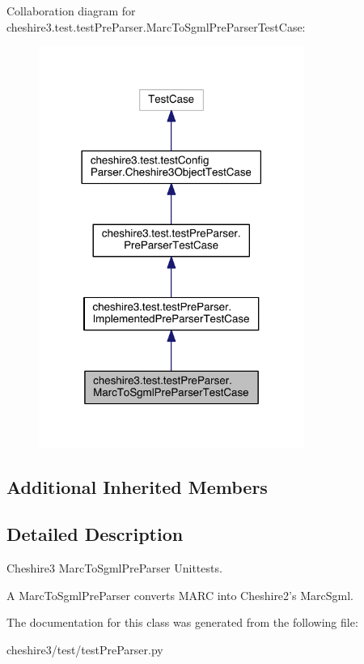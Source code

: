 Collaboration diagram for cheshire3.\-test.\-test\-Pre\-Parser.\-Marc\-To\-Sgml\-Pre\-Parser\-Test\-Case\-:
\nopagebreak
\begin{figure}[H]
\begin{center}
\leavevmode
\includegraphics[width=246pt]{classcheshire3_1_1test_1_1test_pre_parser_1_1_marc_to_sgml_pre_parser_test_case__coll__graph}
\end{center}
\end{figure}
\subsection*{Additional Inherited Members}


\subsection{Detailed Description}
\begin{DoxyVerb}Cheshire3 MarcToSgmlPreParser Unittests.

A MarcToSgmlPreParser converts MARC into Cheshire2's MarcSgml.
\end{DoxyVerb}
 

The documentation for this class was generated from the following file\-:\begin{DoxyCompactItemize}
\item 
cheshire3/test/test\-Pre\-Parser.\-py\end{DoxyCompactItemize}
